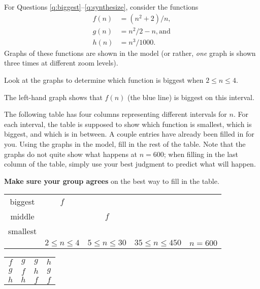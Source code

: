 \documentclass{tufte-handout}
\begin{document}
For Questions \ref{q:biggest}--\ref{q:synthesize}, consider the functions
\begin{align*}
  f(n) &= (n^2 + 2)/n, \\ g(n) &= n^2/2 - n, \text{and} \\ h(n) &= n^3/1000.
\end{align*}
Graphs of these functions are shown in the model (or rather,
\emph{one} graph is shown three times at different zoom levels).
\begin{questions}
\item \label{q:biggest} Look at the graphs to determine which function is
  biggest when $2 \leq n \leq 4$.
  \begin{answer}
    The left-hand graph shows that $f(n)$ (the blue line) is biggest
    on this interval.
  \end{answer}
\item \label{q:table} The following table has four columns
  representing different intervals for $n$.  For each interval, the
  table is supposed to show which function is smallest, which is
  biggest, and which is in between. A couple entries have already been
  filled in for you.  Using the graphs in the model, fill in the rest
  of the table. Note that the graphs do not quite show what happens at
  $n = 600$; when filling in the last column of the table, simply use
  your best judgment to predict what will happen.

  \textbf{Make sure your group agrees} on the best way to fill in the table.

  \setlength{\tabcolsep}{20pt}
  \renewcommand{\arraystretch}{2}
  \begin{fullwidth}
  \begin{tabular}{c|cccc}
    biggest & $f$ & & & \\
    middle & & $f$ & & \\
    smallest & & & & \\
    \hline
        & $2 \leq n \leq 4$ & $5 \leq n \leq 30$ & $35 \leq n \leq 450$ & $n = 600$
  \end{tabular}
  \end{fullwidth}

  \begin{answer}
    \setlength{\tabcolsep}{20pt}
    \renewcommand{\arraystretch}{1}
    \begin{tabular}{cccc}
    $f$ & $g$ & $g$ & $h$ \\
    $g$ & $f$ & $h$ & $g$ \\
    $h$ & $h$ & $f$ & $f$
    \end{tabular}
  \end{answer}


\end{questions}
\end{document}
